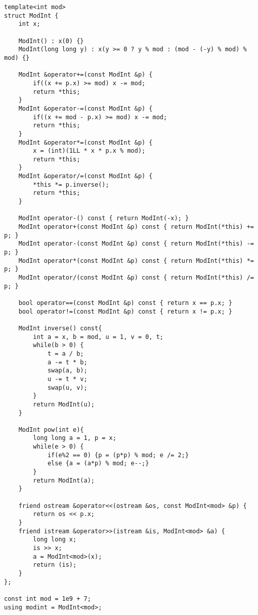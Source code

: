 \documentclass[11pt,a4paper]{jsarticle}
\newcommand{\minititle}[1]{\medskip{\large \sf #1}\medskip}
\begin{document}
\minititle{ModInt}
\begin{lstlisting}
template<int mod>
struct ModInt {
    int x;

    ModInt() : x(0) {}
    ModInt(long long y) : x(y >= 0 ? y % mod : (mod - (-y) % mod) % mod) {}

    ModInt &operator+=(const ModInt &p) {
        if((x += p.x) >= mod) x -= mod;
        return *this;
    }
    ModInt &operator-=(const ModInt &p) {
        if((x += mod - p.x) >= mod) x -= mod;
        return *this;
    }
    ModInt &operator*=(const ModInt &p) {
        x = (int)(1LL * x * p.x % mod);
        return *this;
    }
    ModInt &operator/=(const ModInt &p) {
        *this *= p.inverse();
        return *this;
    }

    ModInt operator-() const { return ModInt(-x); }
    ModInt operator+(const ModInt &p) const { return ModInt(*this) += p; }
    ModInt operator-(const ModInt &p) const { return ModInt(*this) -= p; }
    ModInt operator*(const ModInt &p) const { return ModInt(*this) *= p; }
    ModInt operator/(const ModInt &p) const { return ModInt(*this) /= p; }

    bool operator==(const ModInt &p) const { return x == p.x; }
    bool operator!=(const ModInt &p) const { return x != p.x; }

    ModInt inverse() const{
        int a = x, b = mod, u = 1, v = 0, t;
        while(b > 0) {
            t = a / b;
            a -= t * b;
            swap(a, b);
            u -= t * v;
            swap(u, v);
        }
        return ModInt(u);
    }

    ModInt pow(int e){
        long long a = 1, p = x;
        while(e > 0) {
            if(e%2 == 0) {p = (p*p) % mod; e /= 2;}
            else {a = (a*p) % mod; e--;}
        }
        return ModInt(a);
    }

    friend ostream &operator<<(ostream &os, const ModInt<mod> &p) {
        return os << p.x;
    }
    friend istream &operator>>(istream &is, ModInt<mod> &a) {
        long long x;
        is >> x;
        a = ModInt<mod>(x);
        return (is);
    }
};

const int mod = 1e9 + 7;
using modint = ModInt<mod>;
\end{lstlisting}
\end{document}
